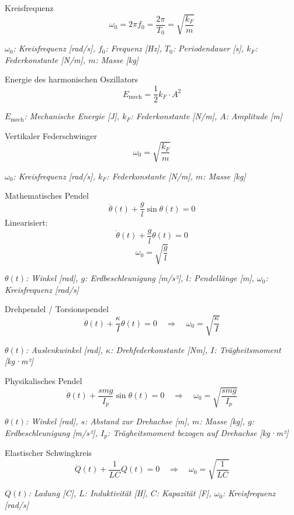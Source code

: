 \documentclass[a4paper,10pt]{article}
\newenvironment{displayformula}
{
	\begin{framed}
		\color{formulaColor}
	}
	{\end{framed}}
\newcommand{\formulalegend}[1]{%
	\par\vspace{0.5ex}%
	{{\color{legendColor}\RaggedRight\small\textit{#1}}}%
	\par\vspace{1.5ex}%
}
\begin{document}
\begin{displayformula}
	Kreisfrequenz
	\[
	\omega_0 = 2\pi f_0 = \frac{2\pi}{T_0} = \sqrt{\frac{k_F}{m}}
	\]
\end{displayformula}
\formulalegend{
	\( \omega_0 \): Kreisfrequenz [rad/s], \( f_0 \): Frequenz [Hz], \( T_0 \): Periodendauer [s], \( k_F \): Federkonstante [N/m], \( m \): Masse [kg]
}

\begin{displayformula}
	Energie des harmonischen Oszillators
	\[
	E_{\text{mech}} = \frac{1}{2} k_F \cdot A^2
	\]
\end{displayformula}
\formulalegend{
	\( E_{\text{mech}} \): Mechanische Energie [J], \( k_F \): Federkonstante [N/m], \( A \): Amplitude [m]
}

\begin{displayformula}
	Vertikaler Federschwinger
	\[
	\omega_0 = \sqrt{\frac{k_F}{m}}
	\]
\end{displayformula}
\formulalegend{
	\( \omega_0 \): Kreisfrequenz [rad/s], \( k_F \): Federkonstante [N/m], \( m \): Masse [kg]
}

\begin{displayformula}
	Mathematisches Pendel
	\[
	\ddot{\theta}(t) + \frac{g}{l} \sin\theta(t) = 0
	\]
	Linearisiert:
	\[
	\ddot{\theta}(t) + \frac{g}{l} \theta(t) = 0
	\]
	\[
	\omega_0 = \sqrt{\frac{g}{l}}
	\]
\end{displayformula}
\formulalegend{
	\( \theta(t) \): Winkel [rad], \( g \): Erdbeschleunigung [m/s²], \( l \): Pendellänge [m], \( \omega_0 \): Kreisfrequenz [rad/s]
}

\begin{displayformula}
	Drehpendel / Torsionspendel
	\[
	\ddot{\theta}(t) + \frac{\kappa}{I} \theta(t) = 0
	\quad \Rightarrow \quad \omega_0 = \sqrt{\frac{\kappa}{I}}
	\]
\end{displayformula}
\formulalegend{
	\( \theta(t) \): Auslenkwinkel [rad], \( \kappa \): Drehfederkonstante [Nm], \( I \): Trägheitsmoment [kg·m²]
}

\begin{displayformula}
	Physikalisches Pendel
	\[
	\ddot{\theta}(t) + \frac{s m g}{I_p} \sin\theta(t) = 0
	\quad \Rightarrow \quad \omega_0 = \sqrt{\frac{s m g}{I_p}}
	\]
\end{displayformula}
\formulalegend{
	\( \theta(t) \): Winkel [rad], \( s \): Abstand zur Drehachse [m], \( m \): Masse [kg], \( g \): Erdbeschleunigung [m/s²], \( I_p \): Trägheitsmoment bezogen auf Drehachse [kg·m²]
}

\begin{displayformula}
	Elastischer Schwingkreis
	\[
	\ddot{Q}(t) + \frac{1}{LC} Q(t) = 0
	\quad \Rightarrow \quad \omega_0 = \sqrt{\frac{1}{LC}}
	\]
\end{displayformula}
\formulalegend{
	\( Q(t) \): Ladung [C], \( L \): Induktivität [H], \( C \): Kapazität [F], \( \omega_0 \): Kreisfrequenz [rad/s]
}
\end{document}
